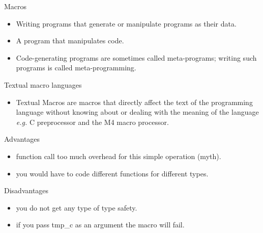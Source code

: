 \begin{frame}{Macros}
\begin{itemize}
\item Writing programs that generate or manipulate programs as their data.
\item A program that manipulates code.
\item Code-generating programs are sometimes called meta-programs; writing such programs
    is called meta-programming.
\end{itemize}
\end{frame}

\begin{frame}{Textual macro languages}
\begin{itemize}
\item Textual Macros are macros that directly affect the text of the programming 
    language without knowing about or dealing with the meaning of the language \emph{e.g.} C 
    preprocessor and the M4 macro processor. 
\end{itemize}
\end{frame}


\begin{frame}{Advantages}
\begin{itemize}
\item function call too much overhead for this simple operation (myth).
\item you would have to code different functions for different types.
\end{itemize}
\end{frame}

\begin{frame}{Disadvantages}
\begin{itemize}
\item you do not get any type of type safety.
\item if you pass tmp\_c as an argument the macro will fail.
\end{itemize}
\end{frame}


